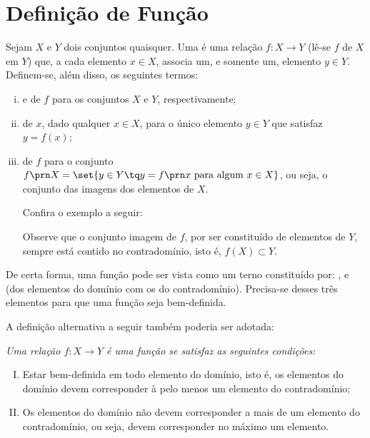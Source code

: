 \section{Definição de Função}

\begin{definition}
Sejam $X$ e $Y$ dois conjuntos quaisquer.
Uma  é uma relação $f: X \to Y$ (lê-se $f$ de $X$ em $Y$) que, a cada elemento $x \in X$, associa um, e somente um, elemento $y \in Y$.
Definem-se, além disso, os seguintes termos:
%
\begin{enumerate}[(i)]
\item {} e  de $f$ para os conjuntos $X$ e $Y$, respectivamente;
\item {} de $x$, dado qualquer $x \in X$, para o único elemento $y \in Y$ que satisfaz $y = f(x)$;
\item {} de $f$ para o conjunto $f\prn X = \set{y \in Y \tq y = f \prn x \text{ para algum } x \in X }$, ou seja, o conjunto das imagens dos elementos de $X$.

Confira o exemplo a seguir:
\begin{center}
    
\end{center}
Observe que o conjunto imagem de $f$, por ser constituído de elementos de $Y$, sempre está contido no contradomínio, isto é, $f(X) \subset Y$.
\end{enumerate}
\end{definition}

De certa forma, uma função pode ser vista como um terno constituído por: ,  e  (dos elementos do domínio com os do contradomínio). 
Precisa-se desses três elementos para que uma função seja bem-definida. 

A definição alternativa a seguir também poderia ser adotada:
{\it \label{def:funcao-alternativa} Uma relação $f: X \to Y$ é uma \emph {função} se satisfaz as seguintes condições:
%
\begin{enumerate}[(I)]
  \item Estar bem-definida em todo elemento do domínio, isto é, os elementos do domínio devem corresponder à pelo menos um elemento do contradomínio;
  \item Os elementos do domínio não devem corresponder a mais de um elemento do contradomínio, ou seja, devem corresponder no máximo um elemento.
\end{enumerate}}


